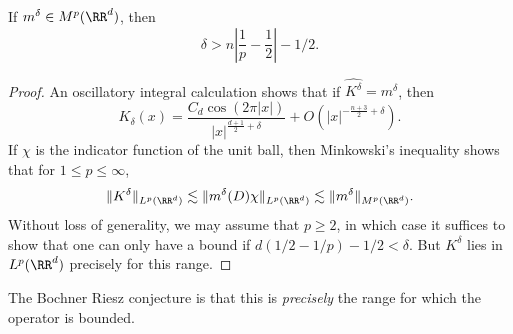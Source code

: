 \begin{theorem}
    If $m^\delta \in M^p(\RR^d)$, then
    \[ \delta > n \left| \frac{1}{p} - \frac{1}{2} \right| - 1/2. \]
\end{theorem}
\begin{proof}
    An oscillatory integral calculation shows that if $\widehat{K^\delta} = m^\delta$, then
    \[ K_\delta(x) = \frac{C_d \cos(2 \pi |x|)}{|x|^{\frac{d+1}{2} + \delta}} + O(|x|^{- \frac{n+3}{2} + \delta}). \]
    If $\chi$ is the indicator function of the unit ball, then Minkowski's inequality shows that for $1 \leq p \leq \infty$,
    \[ \| K^\delta \|_{L^p(\RR^d)} \lesssim \| m^\delta(D) \chi \|_{L^p(\RR^d)} \lesssim \| m^\delta \|_{M^p(\RR^d)}. \]
    Without loss of generality, we may assume that $p \geq 2$, in which case it suffices to show that one can only have a bound if $d(1/2 - 1/p) - 1/2 < \delta$. But $K^\delta$ lies in $L^p(\RR^d)$ precisely for this range.
\end{proof}

The Bochner Riesz conjecture is that this is \emph{precisely} the range for which the operator is bounded.

